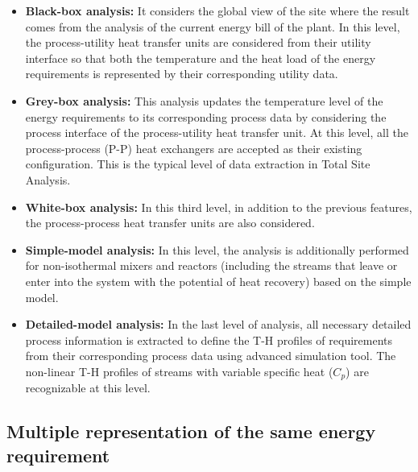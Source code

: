 \begin{itemize}
	\item \textbf{Black-box analysis:}
        It considers the global view of the site where the result comes from the analysis of the current energy bill of the plant. In this level, the process-utility heat transfer units are considered from their utility interface so that both the temperature and the heat load of the energy requirements is represented by their corresponding utility data.
    \item \textbf{Grey-box analysis:}
        This analysis updates the temperature level of the energy requirements to its corresponding process data by considering the process interface of the process-utility heat transfer unit. At this level, all the process-process (P-P) heat exchangers are accepted as their existing configuration. This is the typical level of data extraction in Total Site Analysis.
    \item \textbf{White-box analysis:}
         In this third level, in addition to the previous features, the process-process heat transfer units are also considered. 
    \item \textbf{Simple-model analysis:}
    	In this level, the analysis is additionally performed for non-isothermal mixers and reactors (including the streams that leave or enter into the system with the potential of heat recovery) based on the simple model. 
    \item \textbf{Detailed-model analysis:}
    	In the last level of analysis, all necessary detailed process information is extracted to define the T-H profiles of requirements from their corresponding process data using advanced simulation tool. The non-linear T-H profiles of streams with variable specific heat ($C_{p}$) are recognizable at this level.
\end{itemize}

\subsection{Multiple representation of the same energy requirement}
\label{subsec2:Multi-rep}

